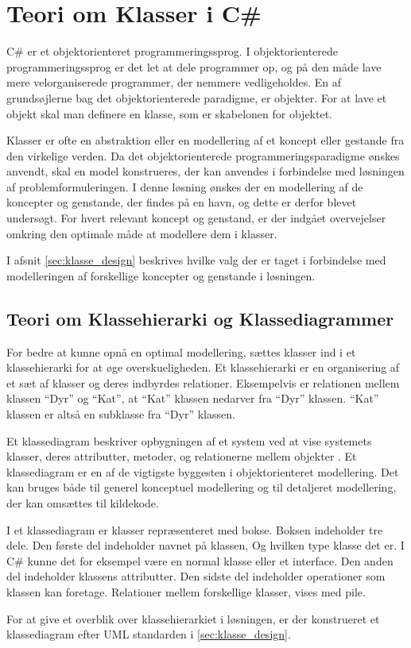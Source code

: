 \section{Teori om Klasser i C\#}
\label{sec:klasse_teori}

C\# er et objektorienteret programmeringssprog. I objektorienterede programmeringssprog er det let at dele programmer op, og på den måde lave mere velorganiserede programmer, der nemmere vedligeholdes. En af grundsøjlerne bag det objektorienterede paradigme, er objekter. For at lave et objekt skal man definere en klasse, som er skabelonen for objektet. 

Klasser er ofte en abstraktion eller en modellering af et koncept eller gestande fra den virkelige verden. Da det objektorienterede programmeringsparadigme ønskes anvendt, skal en model konstrueres, der kan anvendes i forbindelse med løsningen af problemformuleringen. I denne løsning ønskes der en modellering af de koncepter og genstande, der findes på en havn, og dette er derfor blevet undersøgt. For hvert relevant koncept og genstand, er der indgået overvejelser omkring den optimale måde at modellere dem i klasser.

I afsnit \cref{sec:klasse_design} beskrives hvilke valg der er taget i forbindelse med modelleringen af forskellige koncepter og genstande i løsningen.

\subsection{Teori om Klassehierarki og Klassediagrammer}
\label{sub:uml_teori}

For bedre at kunne opnå en optimal modellering, sættes klasser ind i et klassehierarki for at øge overskueligheden. Et klassehierarki er en organisering af et sæt af klasser og deres indbyrdes relationer. Eksempelvis er relationen mellem klassen \enquote{Dyr} og \enquote{Kat}, at \enquote{Kat} klassen nedarver fra \enquote{Dyr} klassen. \enquote{Kat} klassen er altså en subklasse fra \enquote{Dyr} klassen.

Et klassediagram beskriver opbygningen af et system ved at vise systemets klasser, deres attributter, metoder, og relationerne mellem objekter \cite{martin2006agile}. Et klassediagram er en af de vigtigste byggesten i objektorienteret modellering. Det kan bruges både til generel konceptuel modellering og til detaljeret modellering, der kan omsættes til kildekode. 

I et klassediagram er klasser repræsenteret med bokse. Boksen indeholder tre dele. Den første del indeholder navnet på klassen, Og hvilken type klasse det er. I C\# kunne det for eksempel være en normal klasse eller et interface. Den anden del indeholder klassens attributter. Den sidste del indeholder operationer som klassen kan foretage. Relationer mellem forskellige klasser, vises med pile.

For at give et overblik over klassehierarkiet i løsningen, er der konstrueret et klassediagram efter UML standarden i \cref{sec:klasse_design}.



